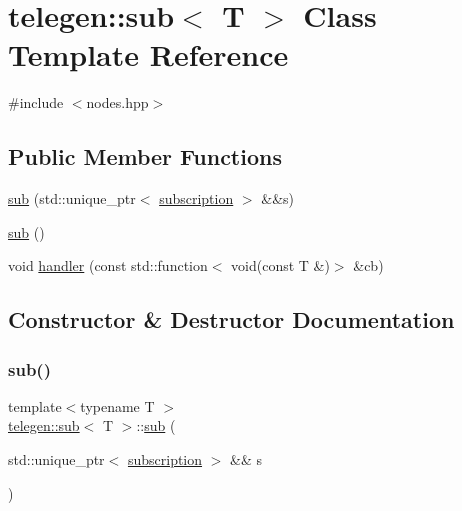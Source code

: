 \hypertarget{classtelegen_1_1sub}{}\section{telegen\+:\+:sub$<$ T $>$ Class Template Reference}
\label{classtelegen_1_1sub}


{\ttfamily \#include $<$nodes.\+hpp$>$}

\subsection*{Public Member Functions}
\begin{DoxyCompactItemize}
\item 
\hyperlink{classtelegen_1_1sub_a90e40c9ecf240073689c04807f3cb43d}{sub} (std\+::unique\+\_\+ptr$<$ \hyperlink{classtelegen_1_1subscription}{subscription} $>$ \&\&s)
\item 
\hyperlink{classtelegen_1_1sub_aedfa8e90ccd9de1ec084e96ef42232cf}{sub} ()
\item 
void \hyperlink{classtelegen_1_1sub_ad1d7edeb15aea1ea4294919ae15faac2}{handler} (const std\+::function$<$ void(const T \&)$>$ \&cb)
\end{DoxyCompactItemize}


\subsection{Constructor \& Destructor Documentation}
\mbox{\label{classtelegen_1_1sub_a90e40c9ecf240073689c04807f3cb43d}} 
\subsubsection{\texorpdfstring{sub()}{sub()}\hspace{0.1cm}{\footnotesize\ttfamily [1/2]}}
{\footnotesize\ttfamily template$<$typename T $>$ \\
\hyperlink{classtelegen_1_1sub}{telegen\+::sub}$<$ T $>$\+::\hyperlink{classtelegen_1_1sub}{sub} (\begin{DoxyParamCaption}\item[{std\+::unique\+\_\+ptr$<$ \hyperlink{classtelegen_1_1subscription}{subscription} $>$ \&\&}]{s }\end{DoxyParamCaption})\hspace{0.3cm}{\ttfamily [inline]}}

